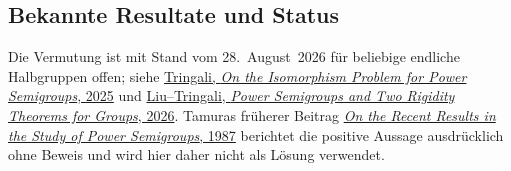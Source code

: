 \documentclass[main.tex]{subfiles}
\begin{document}
\subsection{Bekannte Resultate und Status}

\begin{remark}
Die Vermutung ist mit Stand vom 28.~August~2026 für beliebige endliche
Halbgruppen offen; siehe
\href{https://doi.org/10.1007/978-3-031-75326-8_20}%
  {Tringali, \emph{On the Isomorphism Problem for Power Semigroups}, 2025}
und
\href{https://doi.org/10.48550/arXiv.2606.01917}%
  {Liu--Tringali, \emph{Power Semigroups and Two Rigidity Theorems for
  Groups}, 2026}.
Tamuras früherer Beitrag
\href{https://doi.org/10.1007/978-94-009-3839-7_22}%
  {\emph{On the Recent Results in the Study of Power Semigroups}, 1987}
berichtet die positive Aussage ausdrücklich ohne Beweis und wird hier daher
nicht als Lösung verwendet.


\end{remark}
\end{document}
